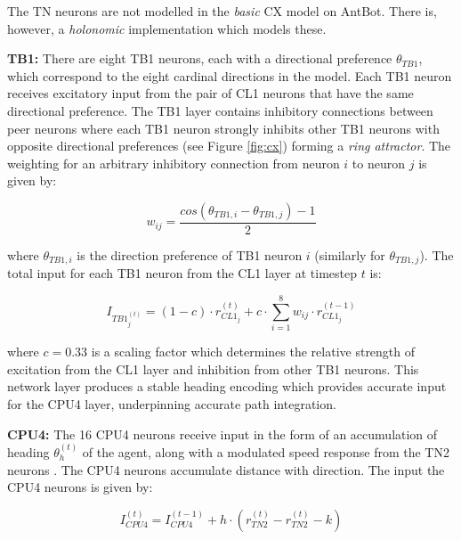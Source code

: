 \documentclass[a4paper,11pt,twoside,openright]{article}
\begin{document}
The TN neurons are not modelled in the \textit{basic} CX model on AntBot. There
is, however, a \textit{holonomic} implementation which models these.
\newline
\par

\textbf{TB1:}
There are eight TB1 neurons, each with a directional preference $\theta_{TB1}$,
which correspond to the eight cardinal directions in the model. Each TB1 neuron
receives excitatory input from the pair of CL1 neurons that have the same
directional preference. The TB1 layer contains inhibitory connections between
peer neurons where each TB1 neuron strongly inhibits other TB1 neurons with
opposite directional preferences (see Figure \ref{fig:cx}) forming a
\textit{ring attractor}\cite{Stone2017}. The weighting for an arbitrary
inhibitory connection from neuron $i$ to neuron $j$ is given by:

\begin{equation}
  w_{ij} =
  \frac{cos(\theta_{TB1,i} - \theta_{TB1,j}) - 1}{2}
\end{equation}

where $\theta_{TB1,i}$ is the direction preference of TB1 neuron $i$ (similarly
for $\theta_{TB1,j}$). The total input for each TB1 neuron from the CL1 layer
at timestep $t$ is:

\begin{equation}
  I_{TB1_{j}^{(t)}} =
  (1 - c) \cdot r_{CL1_j}^{(t)} + c \cdot \sum_{i = 1}^{8} w_{ij}
  \cdot r_{CL1_j}^{(t - 1)}
\end{equation}

where $c = 0.33$ is a scaling factor which determines the relative strength
of excitation from the CL1 layer and inhibition from other TB1 neurons. This
network layer produces a stable heading encoding which provides accurate
input for the CPU4 layer, underpinning accurate path integration.
\newline
\par

\textbf{CPU4:}
The 16 CPU4 neurons receive input in the form of an accumulation of
heading $\theta_h^{(t)}$ of the agent, along with a modulated speed response
from the TN2 neurons \cite{Stone2017}. The CPU4 neurons accumulate distance with
direction. The input the CPU4 neurons is given by:

\begin{equation}
I_{CPU4}^{(t)} = I_{CPU4}^{(t - 1)} + h \cdot (r_{TN2}^{(t)} - r_{TN2}^{(t)} - k)
\end{equation}
\end{document}
